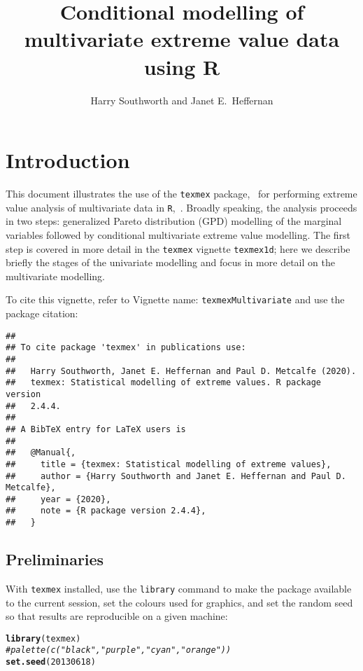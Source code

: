 \documentclass[10pt]{article}\usepackage[]{graphicx}\usepackage[]{color}
\makeatletter
\newcommand{\hlnum}[1]{\textcolor[rgb]{0.686,0.059,0.569}{#1}}%
\newcommand{\hlcom}[1]{\textcolor[rgb]{0.678,0.584,0.686}{\textit{#1}}}%
\newcommand{\hlstd}[1]{\textcolor[rgb]{0.345,0.345,0.345}{#1}}%
\newcommand{\hlkwd}[1]{\textcolor[rgb]{0.737,0.353,0.396}{\textbf{#1}}}%
\newenvironment{kframe}{%
 \def\at@end@of@kframe{}%
 \ifinner\ifhmode%
  \def\at@end@of@kframe{\end{minipage}}%
  \begin{minipage}{\columnwidth}%
 \fi\fi%
 \def\FrameCommand##1{\hskip\@totalleftmargin \hskip-\fboxsep
 \colorbox{shadecolor}{##1}\hskip-\fboxsep
     \hskip-\linewidth \hskip-\@totalleftmargin \hskip\columnwidth}%
 \MakeFramed {\advance\hsize-\width
   \@totalleftmargin\z@ \linewidth\hsize
   \@setminipage}}%
 {\par\unskip\endMakeFramed%
 \at@end@of@kframe}
\newenvironment{knitrout}{}{} %
\makeatother
\begin{document}
\title{Conditional modelling of multivariate extreme value data using R}
\author{Harry Southworth and Janet E.\ Heffernan}
\maketitle

%
\section{Introduction}
%


This document illustrates the use of the {\tt texmex} package,~\cite{texmex}
for performing extreme value analysis of multivariate data in {\tt R},~\cite{R}.
Broadly speaking, the analysis proceeds in
two steps: generalized Pareto distribution (GPD) modelling of
the marginal variables followed by conditional multivariate extreme value
modelling.  The first step is covered in more detail in the {\tt texmex} vignette
{\tt texmex1d}; here we describe briefly the stages of the univariate modelling
and focus in more detail on the multivariate modelling.

To cite this vignette, refer to Vignette name: {\tt texmexMultivariate} and use the package citation:
\begin{knitrout}
\color{fgcolor}\begin{kframe}
\begin{verbatim}
## 
## To cite package 'texmex' in publications use:
## 
##   Harry Southworth, Janet E. Heffernan and Paul D. Metcalfe (2020).
##   texmex: Statistical modelling of extreme values. R package version
##   2.4.4.
## 
## A BibTeX entry for LaTeX users is
## 
##   @Manual{,
##     title = {texmex: Statistical modelling of extreme values},
##     author = {Harry Southworth and Janet E. Heffernan and Paul D. Metcalfe},
##     year = {2020},
##     note = {R package version 2.4.4},
##   }
\end{verbatim}
\end{kframe}
\end{knitrout}
%
\subsection{Preliminaries}
%
With {\tt texmex} installed, use the {\tt library} command to make the package
available to the current session, set the colours used for graphics, and set the
random seed so that results are reproducible on a given machine:
\begin{knitrout}
\color{fgcolor}\begin{kframe}
\begin{alltt}
\hlkwd{library}\hlstd{(texmex)}
\hlcom{#palette(c("black","purple","cyan","orange"))}
\hlkwd{set.seed}\hlstd{(}\hlnum{20130618}\hlstd{)}
\end{alltt}
\end{kframe}
\end{knitrout}
%
\end{document}
